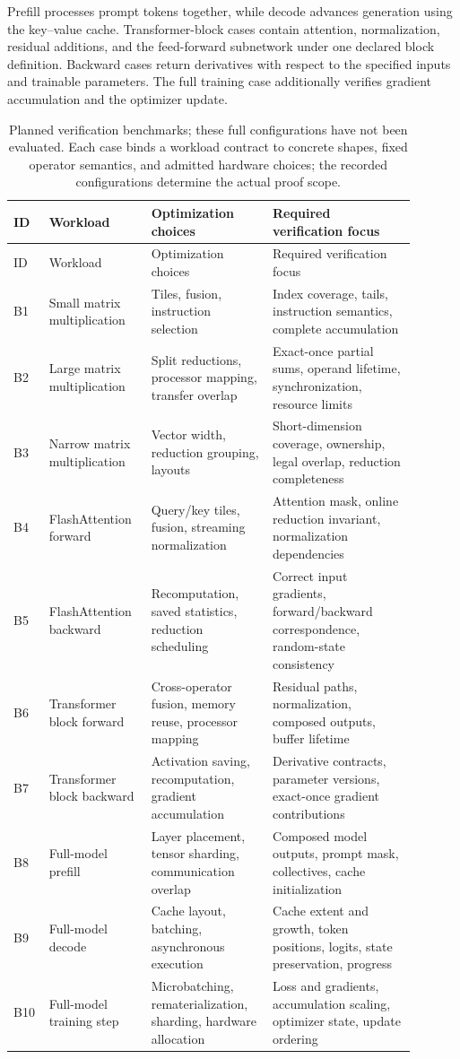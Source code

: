 \documentclass[11pt]{article}
\begin{document}
Prefill processes prompt tokens together, while decode advances generation using the key--value cache. Transformer-block cases contain attention, normalization, residual additions, and the feed-forward subnetwork under one declared block definition. Backward cases return derivatives with respect to the specified inputs and trainable parameters. The full training case additionally verifies gradient accumulation and the optimizer update.

\small
\begin{longtable}{p{0.05\linewidth}p{0.23\linewidth}p{0.28\linewidth}p{0.33\linewidth}}
\caption{Planned verification benchmarks; these full configurations have not been evaluated. Each case binds a workload contract to concrete shapes, fixed operator semantics, and admitted hardware choices; the recorded configurations determine the actual proof scope.}\label{tab:benchmarks}\\
\toprule
ID & Workload & Optimization choices & Required verification focus \\
\midrule
\endfirsthead
\toprule ID & Workload & Optimization choices & Required verification focus \\ \midrule
\endhead
B1 & Small matrix multiplication & Tiles, fusion, instruction selection & Index coverage, tails, instruction semantics, complete accumulation \\
B2 & Large matrix multiplication & Split reductions, processor mapping, transfer overlap & Exact-once partial sums, operand lifetime, synchronization, resource limits \\
B3 & Narrow matrix multiplication & Vector width, reduction grouping, layouts & Short-dimension coverage, ownership, legal overlap, reduction completeness \\
B4 & FlashAttention forward & Query/key tiles, fusion, streaming normalization & Attention mask, online reduction invariant, normalization dependencies \\
B5 & FlashAttention backward & Recomputation, saved statistics, reduction scheduling & Correct input gradients, forward/backward correspondence, random-state consistency \\
B6 & Transformer block forward & Cross-operator fusion, memory reuse, processor mapping & Residual paths, normalization, composed outputs, buffer lifetime \\
B7 & Transformer block backward & Activation saving, recomputation, gradient accumulation & Derivative contracts, parameter versions, exact-once gradient contributions \\
B8 & Full-model prefill & Layer placement, tensor sharding, communication overlap & Composed model outputs, prompt mask, collectives, cache initialization \\
B9 & Full-model decode & Cache layout, batching, asynchronous execution & Cache extent and growth, token positions, logits, state preservation, progress \\
B10 & Full-model training step & Microbatching, rematerialization, sharding, hardware allocation & Loss and gradients, accumulation scaling, optimizer state, update ordering \\
\bottomrule
\end{longtable}
\normalsize
\end{document}
